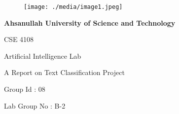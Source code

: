 \documentclass[12pt]{article}
\begin{document}

\begin{figure}[H]
	\begin{Center}
		\texttt{[image: ./media/image1.jpeg]}
	\end{Center}
\end{figure}



\par


\vspace{\baselineskip}
\begin{Center}
{\fontsize{16pt}{19.2pt}\selectfont \textbf{Ahsanullah University of Science and Technology}\par}
\end{Center}\par

\begin{Center}
{\fontsize{16pt}{19.2pt}\selectfont CSE 4108\par}
\end{Center}\par

\begin{Center}
{\fontsize{16pt}{19.2pt}\selectfont Artificial Intelligence Lab\par}
\end{Center}\par


\vspace{\baselineskip}
\begin{Center}
{\fontsize{16pt}{19.2pt}\selectfont A Report on Text Classification Project\par}
\end{Center}\par


\vspace{\baselineskip}
\begin{Center}
{\fontsize{16pt}{19.2pt}\selectfont Group Id : 08\par}
\end{Center}\par

\begin{Center}
{\fontsize{16pt}{19.2pt}\selectfont Lab Group No : B-2\par}
\end{Center}\par
\end{document}
